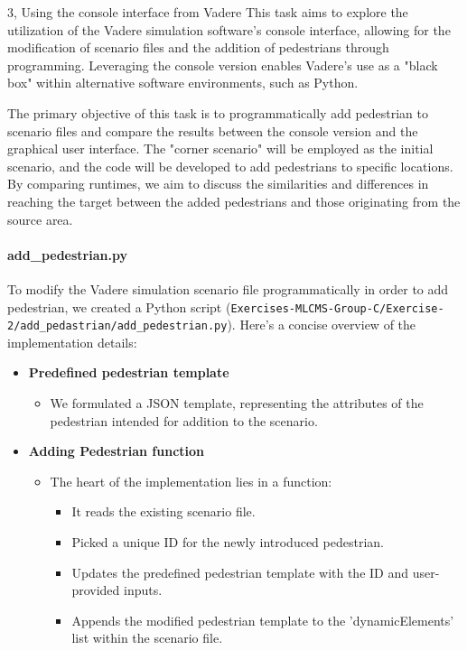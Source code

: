 \begin{task}{3, Using the console interface from Vadere}
This task aims to explore the utilization of the Vadere simulation software's console interface, allowing for the modification of scenario files and the addition of pedestrians through programming. Leveraging the console version enables Vadere's use as a "black box" within alternative software environments, such as Python.

The primary objective of this task is to programmatically add pedestrian to scenario files and compare the results between the console version and the graphical user interface. The "corner scenario" will be employed as the initial scenario, and the code will be developed to add pedestrians to specific locations. By comparing runtimes, we aim to discuss the similarities and differences in reaching the target between the added pedestrians and those originating from the source area.

\paragraph{add\_pedestrian.py}
To modify the Vadere simulation scenario file programmatically in order to add pedestrian, we created a Python script (\texttt{Exercises-MLCMS-Group-C/Exercise-2/add\_pedastrian/add\_pedestrian.py}). Here's a concise overview of the implementation details:

\begin{itemize}
    \item \textbf{Predefined pedestrian template}
    \begin{itemize}
        \item We formulated a JSON template, representing the attributes of the pedestrian intended for addition to the scenario.
    \end{itemize}

    \item \textbf{Adding Pedestrian function}
    \begin{itemize}
        \item The heart of the implementation lies in a function:
        \begin{itemize}
            \item It reads the existing scenario file.
            \item Picked a unique ID for the newly introduced pedestrian.
            \item Updates the predefined pedestrian template with the ID and user-provided inputs.
            \item Appends the modified pedestrian template to the 'dynamicElements' list within the scenario file.
        \end{itemize}
    \end{itemize}
    

\end{itemize}
\end{task}
